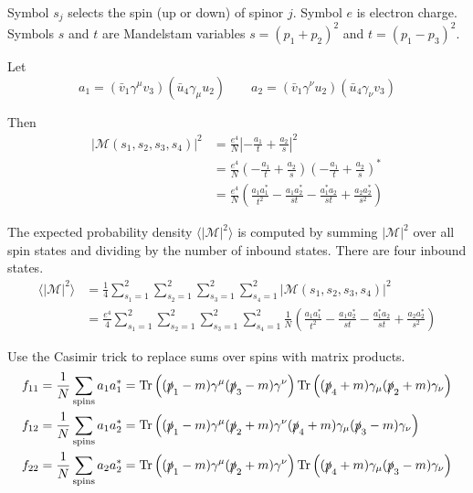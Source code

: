 \documentclass[12pt]{article}
\begin{document}
\noindent
Symbol $s_j$ selects the spin (up or down) of spinor $j$.
Symbol $e$ is electron charge.
Symbols $s$ and $t$ are Mandelstam variables $s=(p_1+p_2)^2$ and $t=(p_1-p_3)^2$.

\bigskip
\noindent
Let
\begin{equation*}
a_1=(\bar{v}_1\gamma^\mu v_3)(\bar{u}_4\gamma_\mu u_2)
\qquad
a_2=(\bar{v}_1\gamma^\nu u_2)(\bar{u}_4\gamma_\nu v_3)
\end{equation*}

\noindent
Then
\begin{align*}
|\mathcal{M}(s_1,s_2,s_3,s_4)|^2
&=
\frac{e^4}{N}\left|{-\frac{a_1}{t}} + \frac{a_2}{s}\right|^2\\
&=
\frac{e^4}{N}\left(-\frac{a_1}{t} + \frac{a_2}{s}\right)\left(-\frac{a_1}{t} + \frac{a_2}{s}\right)^*\\
&=
\frac{e^4}{N}
\left(
\frac{a_1a_1^*}{t^2} - \frac{a_1a_2^*}{st} -
\frac{a_1^*a_2}{st} + \frac{a_2a_2^*}{s^2}
\right)
\end{align*}

\noindent
The expected probability density $\langle|\mathcal{M}|^2\rangle$ is computed
by summing $|\mathcal{M}|^2$ over all spin states and dividing by the number of inbound states.
There are four inbound states.
\begin{align*}
\langle|\mathcal{M}|^2\rangle
&=
\frac{1}{4}\sum_{s_1=1}^2\sum_{s_2=1}^2\sum_{s_3=1}^2\sum_{s_4=1}^2
|\mathcal{M}(s_1,s_2,s_3,s_4)|^2\\
&=
\frac{e^4}{4}\sum_{s_1=1}^2\sum_{s_2=1}^2\sum_{s_3=1}^2\sum_{s_4=1}^2
\frac{1}{N}
\left(
\frac{a_1a_1^*}{t^2} - \frac{a_1a_2^*}{st} -
\frac{a_1^*a_2}{st} + \frac{a_2a_2^*}{s^2}
\right)
\end{align*}

\noindent
Use the Casimir trick to replace sums over spins with matrix products.
\begin{align*}
f_{11}&=\frac{1}{N}\sum_\text{spins}a_1a_1^*=
\mathop{\rm Tr}\left(
(\slashed{p}_1-m)\gamma^\mu(\slashed{p}_3-m)\gamma^\nu
\right)
\mathop{\rm Tr}\left(
(\slashed{p}_4+m)\gamma_\mu(\slashed{p}_2+m)\gamma_\nu
\right)
\\
f_{12}&=\frac{1}{N}\sum_{\rm spins}a_1a_2^*=
\mathop{\rm Tr}\left(
(\slashed{p}_1-m)\gamma^\mu(\slashed{p}_2+m)\gamma^\nu
(\slashed{p}_4+m)\gamma_\mu(\slashed{p}_3-m)\gamma_\nu
\right)
\\
f_{22}&=\frac{1}{N}\sum_\text{spins}a_2a_2^*=
\mathop{\rm Tr}\left(
(\slashed{p}_1-m)\gamma^\mu(\slashed{p}_2+m)\gamma^\nu
\right)
\mathop{\rm Tr}\left(
(\slashed{p}_4+m)\gamma_\mu(\slashed{p}_3-m)\gamma_\nu
\right)
\end{align*}
\end{document}

